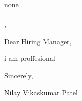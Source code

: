 \documentclass[11pt,a4paper]{letter}
\begin{document}
\begin{letter}{none\\
\\
, }

\address{Nilay Vikaskumar Patel\\
B-3 SHAGUN AVENUE Kapadvanj\\
Kapadvanj, Kheda, Gujarat, India, 387620\\
09016989674\\
\href{mailto:nilaypatel10721@gmail.com}{nilaypatel10721@gmail.com}}

\date{April 11, 2025}

\opening{Dear Hiring Manager,}

i am proffesional



\closing{Sincerely,}

\vspace{0.5in}
Nilay Vikaskumar Patel

\end{letter}
\end{document}

